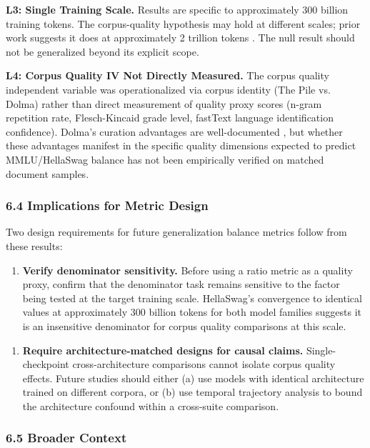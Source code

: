 \textbf{L3: Single Training Scale.} Results are specific to approximately 300 billion training tokens. The corpus-quality hypothesis may hold at different scales; prior work suggests it does at approximately 2 trillion tokens \citep{Groeneveld2024OLMo}. The null result should not be generalized beyond its explicit scope.

\textbf{L4: Corpus Quality IV Not Directly Measured.} The corpus quality independent variable was operationalized via corpus identity (The Pile vs. Dolma) rather than direct measurement of quality proxy scores (n-gram repetition rate, Flesch-Kincaid grade level, fastText language identification confidence). Dolma's curation advantages are well-documented \citep{Soldaini2024Dolma}, but whether these advantages manifest in the specific quality dimensions expected to predict MMLU/HellaSwag balance has not been empirically verified on matched document samples.

\subsubsection{6.4 Implications for Metric Design}

Two design requirements for future generalization balance metrics follow from these results:

\begin{enumerate}
\item \textbf{Verify denominator sensitivity.} Before using a ratio metric as a quality proxy, confirm that the denominator task remains sensitive to the factor being tested at the target training scale. HellaSwag's convergence to identical values at approximately 300 billion tokens for both model families suggests it is an insensitive denominator for corpus quality comparisons at this scale.
\end{enumerate}

\begin{enumerate}
\item \textbf{Require architecture-matched designs for causal claims.} Single-checkpoint cross-architecture comparisons cannot isolate corpus quality effects. Future studies should either (a) use models with identical architecture trained on different corpora, or (b) use temporal trajectory analysis to bound the architecture confound within a cross-suite comparison.
\end{enumerate}

\subsubsection{6.5 Broader Context}

